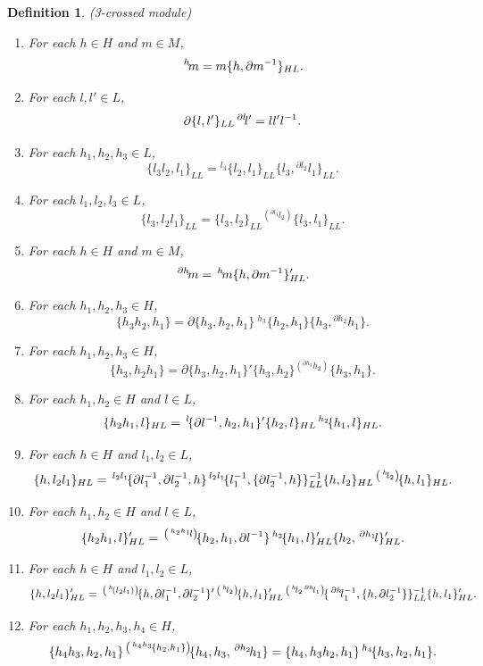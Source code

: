 \documentclass{tac}
\newtheorem{dfn}{Definition}
\newcommand{\act}[1]{\,\sp{#1}\!}
\begin{document}
\begin{dfn}{(3-crossed module)}
\begin{enumerate}
  
  \item For each $h\in H$ and $m \in M$,
 \[
 \act{h}m = m\{h,\partial m^{-1}\}_{HL}  .
 \] 
\label{act_h_m_3cm}

 \item For each $l,l'\in L$,
 \[
\partial\{l,l'\}_{LL}\act{\partial l}l' = ll'l^{-1}.
 \]
 \label{dll}
  \item  For each $h_1,h_2, h_3 \in L$,
  \[
  \{l_3l_2,l_1\}_{LL}={^{l_3}}\{l_2, l_1\}_{LL}\{l_3, {^{\partial l_2}}l_1 \}_{LL}.
  \] 
  \label{lll}
  \item For each $l_1,l_2, l_3 \in L$,
  \[
  \{l_3,l_2 l_1\}_{LL}=\{l_3, l_2\}_{LL} {^{(^{\partial l_3} l_2)}}\{l_3, l_1\}_{LL}.
  \] 
  \label{rll}
  \item For each $h\in H$ and $m \in M$,
 \[
 \act{\partial h}m = \act{h}m\{h,\partial m^{-1}\}'_{HL}  .
 \] 
 \label{dhmnl}
  \item For each $h_1,h_2,h_3 \in H$,
\[
\{h_3h_2,h_1\} = \partial\{h_3,h_2,h_1\}\ {{}^{h_3}\{h_2,h_1\}}\{h_3, {}^{\partial h_2}h_1\}.
\]  
\label{dhmnr}
  \item For each $h_1,h_2,h_3 \in H$,
\[
\{h_3,h_2h_1\} = \partial\{h_3,h_2,h_1\}' \{h_3,h_2\}{}^{\left({}^{\partial h_3}h_2\right) }\{h_3, h_1\}.
\]
  \item For each $h_1,h_2 \in H$ and $l \in L$,
\[
\{h_2h_1,l\}_{HL} = \act{l}\{\partial l^{-1},h_2,h_1\}'\{h_2,l\}_{HL} \act{h_2}\{h_1,l\}_{HL}  .
\]  
\label{rl:hhl}

  \item For each $h \in H$ and $l_1,l_2 \in L$,
\[
\{h,l_2l_1\}_{HL} = \act{l_2l_1}\{\partial l_1^{-1},\partial l_2^{-1},h\}\act{l_2l_1}\{l_1^{-1},\{\partial l_2^{-1},h\}\}_{LL} ^{-1}\{h,l_2\}_{HL} \act{\left(\act{h}l_2\right)}\{h,l_1\}_{HL}  .
\] 
  \item For each $h_1,h_2 \in H$ and $l \in L$,
\[
\{h_2h_1,l\}'_{HL} = \act{\left(\act{h_2h_1}l\right)}\{h_2,h_1,\partial l^{-1}\}\act{h_2}\{h_1,l\}'_{HL}\{h_2,\act{\partial h_1}l\}'_{HL} .
\]   
  \item For each $h \in H$ and $l_1,l_2 \in L$,
\[
\{h,l_2l_1\}'_{HL} = \act{\left(\act{h}(l_2l_1)\right)}\{h,\partial l_1^{-1},\partial l_2^{-1}\}'\act{\left(\act{h}l_2\right)}\{h,l_1\}'_{HL}\act{\left(\act{h}l_2\act{\partial h}l_1\right)}\{\act{\partial h}l_1^{-1},\{h,\partial l_2^{-1}\}\}_{LL}^{-1}\{h,l_1\}'_{HL}  .
\] 
\label{rrHL}
 \item For each $h_1,h_2,h_3,h_4 \in H$,
 \[
 \{h_4h_3,h_2,h_1\}\act{\left(\act{h_4h_3}\{h_2,h_1\}\right)}\{h_4,h_3,\act{\partial h_2}h_1\} = \{h_4,h_3h_2,h_1\}\act{h_4}\{h_3,h_2,h_1\} .
 \]
  \label{lhmnr}
  

\end{enumerate}
\end{dfn}
\end{document}
